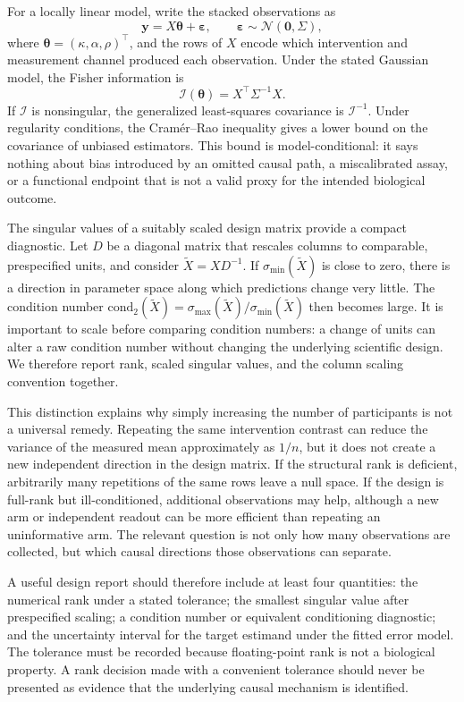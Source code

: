 \documentclass[10pt,a4paper]{article}
\begin{document}
For a locally linear model, write the stacked observations as
\[
\mathbf y = X\boldsymbol\theta+\boldsymbol\varepsilon,\qquad
\boldsymbol\varepsilon\sim\mathcal N(\mathbf 0,\Sigma),
\]
where \(\boldsymbol\theta=(\kappa,\alpha,\rho)^\top\), and the rows of \(X\) encode which intervention and measurement channel produced each observation. Under the stated Gaussian model, the Fisher information is
\[
\mathcal I(\boldsymbol\theta)=X^\top\Sigma^{-1}X.
\]
If \(\mathcal I\) is nonsingular, the generalized least-squares covariance is \(\mathcal I^{-1}\). Under regularity conditions, the Cramér--Rao inequality gives a lower bound on the covariance of unbiased estimators. This bound is model-conditional: it says nothing about bias introduced by an omitted causal path, a miscalibrated assay, or a functional endpoint that is not a valid proxy for the intended biological outcome.

The singular values of a suitably scaled design matrix provide a compact diagnostic. Let \(D\) be a diagonal matrix that rescales columns to comparable, prespecified units, and consider \(\widetilde X=XD^{-1}\). If \(\sigma_{\min}(\widetilde X)\) is close to zero, there is a direction in parameter space along which predictions change very little. The condition number \(\mathrm{cond}_2(\widetilde X)=\sigma_{\max}(\widetilde X)/\sigma_{\min}(\widetilde X)\) then becomes large. It is important to scale before comparing condition numbers: a change of units can alter a raw condition number without changing the underlying scientific design. We therefore report rank, scaled singular values, and the column scaling convention together.

This distinction explains why simply increasing the number of participants is not a universal remedy. Repeating the same intervention contrast can reduce the variance of the measured mean approximately as \(1/n\), but it does not create a new independent direction in the design matrix. If the structural rank is deficient, arbitrarily many repetitions of the same rows leave a null space. If the design is full-rank but ill-conditioned, additional observations may help, although a new arm or independent readout can be more efficient than repeating an uninformative arm. The relevant question is not only how many observations are collected, but which causal directions those observations can separate.

A useful design report should therefore include at least four quantities: the numerical rank under a stated tolerance; the smallest singular value after prespecified scaling; a condition number or equivalent conditioning diagnostic; and the uncertainty interval for the target estimand under the fitted error model. The tolerance must be recorded because floating-point rank is not a biological property. A rank decision made with a convenient tolerance should never be presented as evidence that the underlying causal mechanism is identified.
\end{document}
